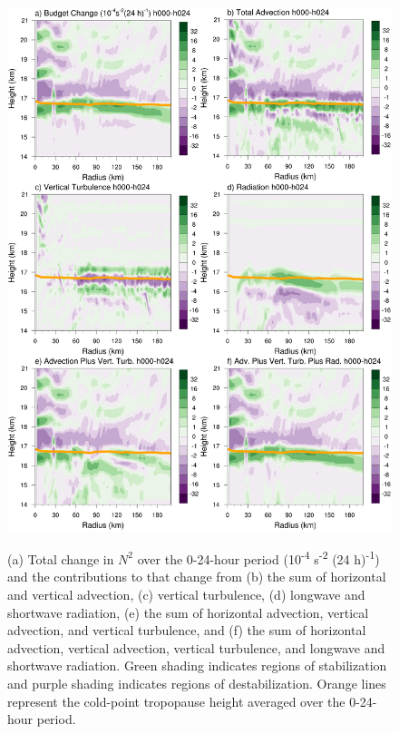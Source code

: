 \documentclass{ametsoc}
\begin{document}
\begin{figure}[ht]
\centerline{\includegraphics[width=39pc]{h000-h024-budgetterms.png}}
\end{figure}
\begin{figure}
\caption{(a) Total change in $N^2$ over the 0-24-hour period (10\textsuperscript{-4} s\textsuperscript{-2} (24 h)\textsuperscript{-1}) and the contributions to that change from (b) the sum of horizontal and vertical advection, (c) vertical turbulence, (d) longwave and shortwave radiation, (e) the sum of horizontal advection, vertical advection, and vertical turbulence, and (f) the sum of horizontal advection, vertical advection, vertical turbulence, and longwave and shortwave radiation.
Green shading indicates regions of stabilization and purple shading indicates regions of destabilization.
Orange lines represent the cold-point tropopause height averaged over the 0-24-hour period.}
\label{fig:stab-00-24}
\end{figure}
\end{document}
